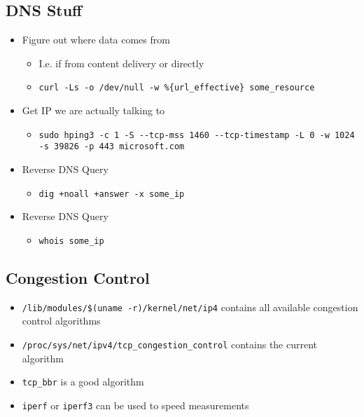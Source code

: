 \subsection{DNS Stuff}
\begin{itemize}
    \item Figure out where data comes from
        \begin{itemize}
            \item I.e. if from content delivery or directly
            \item \verb+curl -Ls -o /dev/null -w %{url_effective} some_resource+
        \end{itemize}
    \item Get IP we are actually talking to
        \begin{itemize}
            \item \verb+sudo hping3 -c 1 -S --tcp-mss 1460 --tcp-timestamp -L 0 -w 1024 -s 39826 -p 443 microsoft.com+
        \end{itemize}
    \item Reverse DNS Query
        \begin{itemize}
            \item \verb|dig +noall +answer -x some_ip|
        \end{itemize}
    \item Reverse DNS Query
        \begin{itemize}
            \item \verb+whois some_ip+
        \end{itemize}
\end{itemize}

\subsection{Congestion Control}
\begin{itemize}
    \item \verb+/lib/modules/$(uname -r)/kernel/net/ip4+ contains all available congestion control algorithms
    \item \verb+/proc/sys/net/ipv4/tcp_congestion_control+ contains the current algorithm
    \item \verb+tcp_bbr+ is a good algorithm
    \item \verb+iperf+ or \verb+iperf3+ can be used to speed measurements
\end{itemize}
